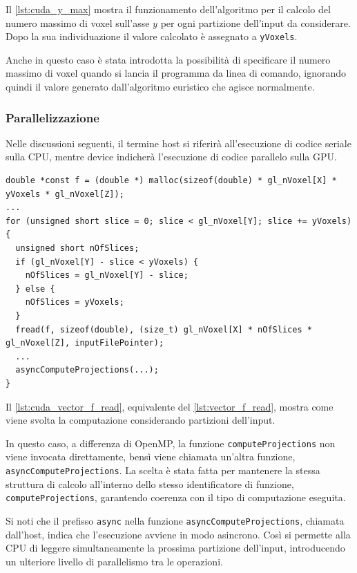 \documentclass[12pt,a4paper]{report}
\begin{document}
Il \autoref{lst:cuda_y_max} mostra il funzionamento dell'algoritmo per il calcolo del numero massimo di voxel sull'asse \(y\) per
ogni partizione dell'input da considerare.
Dopo la sua individuazione il valore calcolato è assegnato a \mbox{\lstinline{yVoxels}.}

Anche in questo caso è stata introdotta la possibilità di specificare il numero massimo di voxel quando si lancia il programma da
linea di comando, ignorando quindi il valore generato dall'algoritmo euristico che agisce normalmente.

\subsubsection{Parallelizzazione}

Nelle discussioni seguenti, il termine host si riferirà all'esecuzione di codice seriale sulla CPU, mentre device indicherà
l'esecuzione di codice parallelo sulla GPU.

\begin{lstlisting}[language=CStyle, caption={Codice CUDA-C per la lettura di \(f\).}, label={lst:cuda_vector_f_read}]
double *const f = (double *) malloc(sizeof(double) * gl_nVoxel[X] * yVoxels * gl_nVoxel[Z]);
...
for (unsigned short slice = 0; slice < gl_nVoxel[Y]; slice += yVoxels) {
  unsigned short nOfSlices;
  if (gl_nVoxel[Y] - slice < yVoxels) {
    nOfSlices = gl_nVoxel[Y] - slice;
  } else {
    nOfSlices = yVoxels;
  }
  fread(f, sizeof(double), (size_t) gl_nVoxel[X] * nOfSlices * gl_nVoxel[Z], inputFilePointer);
  ...
  asyncComputeProjections(...);
}
\end{lstlisting}

Il \autoref{lst:cuda_vector_f_read}, equivalente del \autoref{lst:vector_f_read}, mostra come viene svolta la computazione
considerando partizioni dell'input.

In questo caso, a differenza di OpenMP, la funzione \lstinline{computeProjections} non viene invocata direttamente, bensì viene
chiamata un'altra funzione, \mbox{\lstinline{asyncComputeProjections}.}
La scelta è stata fatta per mantenere la stessa struttura di calcolo all'interno dello stesso identificatore di funzione,
\lstinline{computeProjections}, garantendo coerenza con il tipo di computazione eseguita.

Si noti che il prefisso \lstinline{async} nella funzione \mbox{\lstinline{asyncComputeProjections},} chiamata dall'host, indica
che l'esecuzione avviene in modo asincrono.
Così si permette alla CPU di leggere simultaneamente la prossima partizione dell'input, introducendo un ulteriore livello di
parallelismo tra le operazioni.
\end{document}
